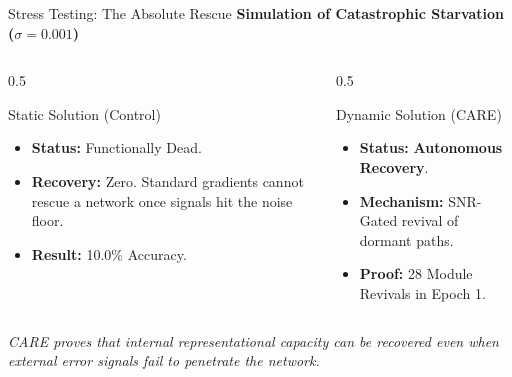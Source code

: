 \documentclass[aspectratio=169]{beamer}
\begin{document}
\begin{frame}{Stress Testing: The Absolute Rescue}
    \textbf{Simulation of Catastrophic Starvation ($\sigma=0.001$)}
    
    \vspace{0.2cm}
    \begin{columns}
        \begin{column}{0.5\textwidth}
            \begin{block}{Static Solution (Control)}
                \begin{itemize}
                    \item \textbf{Status:} Functionally Dead.
                    \item \textbf{Recovery:} Zero. Standard gradients cannot rescue a network once signals hit the noise floor.
                    \item \textbf{Result:} 10.0\% Accuracy.
                \end{itemize}
            \end{block}
        \end{column}
        \begin{column}{0.5\textwidth}
            \begin{block}{Dynamic Solution (CARE)}
                \begin{itemize}
                    \item \textbf{Status:} \textbf{Autonomous Recovery}.
                    \item \textbf{Mechanism:} SNR-Gated revival of dormant paths.
                    \item \textbf{Proof:} 28 Module Revivals in Epoch 1.
                \end{itemize}
            \end{block}
        \end{column}
    \end{columns}

    \vspace{0.4cm}
    \centering
    \textit{CARE proves that internal representational capacity can be recovered even when external error signals fail to penetrate the network.}
\end{frame}
\end{document}
